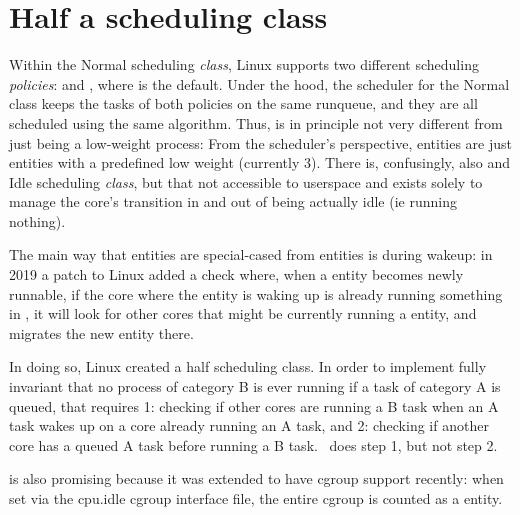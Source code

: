 
\chapter{Half a scheduling class}\label{chp:sched_idle}

Within the Normal scheduling \textit{class}, Linux supports two different
scheduling \textit{policies}: \schednormal{} and \schedidle{}, where
\schednormal{} is the default. Under the hood, the scheduler for the Normal
class keeps the tasks of both policies on the same runqueue, and they are all
scheduled using the same algorithm. Thus, \schedidle{} is in principle not very
different from just being a low-weight process: From the scheduler's
perspective, \schedidle{} entities are just entities with a predefined low
weight (currently 3). There is, confusingly, also and Idle scheduling
\textit{class}, but that not accessible to userspace and exists solely to manage
the core's transition in and out of being actually idle (ie running nothing).

The main way that \schedidle{} entities are special-cased from \schednormal{}
entities is during wakeup: in 2019 a patch to Linux\cite{fixing-sched-idle-lwn}
added a check where, when a \schednormal{} entity becomes newly runnable, if the
core where the entity is waking up is already running something in
\schednormal{}, it will look for other cores that might be currently running a
\schedidle{} entity, and migrates the new entity there.

In doing so, Linux created a half scheduling class. In order to implement fully
invariant that no process of category B is ever running if a task of category A
is queued, that requires 1: checking if other cores are running a B task when an
A task wakes up on a core already running an A task, and 2: checking if another
core has a queued A task before running a B task.\ \schedidle{} does step 1, but
not step 2.

\schedidle{} is also promising because it was extended to have cgroup support
recently\cite{cgroup-idle-patch}: when set via the cpu.idle cgroup interface
file, the entire cgroup is counted as a \schedidle{} entity.

